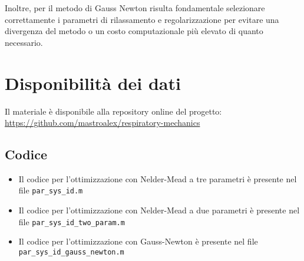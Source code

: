 Inoltre, per il metodo di Gauss Newton risulta fondamentale selezionare correttamente i parametri di rilassamento e regolarizzazione per evitare una divergenza del metodo o un costo computazionale più elevato di quanto necessario.

\section*{Disponibilità dei dati}

Il materiale è disponibile alla repository online del progetto: \url{https://github.com/mastroalex/respiratory-mechanics}

\subsection*{Codice}

\begin{itemize}
	\item Il codice per l'ottimizzazione con Nelder-Mead a tre parametri è presente nel file \texttt{par\_sys\_id.m}
	\item Il codice per l'ottimizzazione con Nelder-Mead a due parametri è presente nel file \texttt{par\_sys\_id\_two\_param.m}
	\item Il codice per l'ottimizzazione con Gauss-Newton è presente nel file \texttt{par\_sys\_id\_gauss\_newton.m}
\end{itemize}

\raggedbottom

\pagebreak
\printbibliography[title=Riferimenti]



